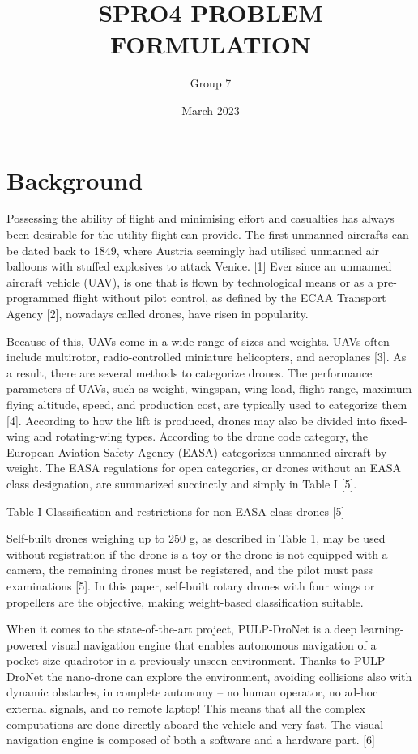 \documentclass{article}
\title{SPRO4 PROBLEM FORMULATION}
\author{Group 7}
\date{March 2023}
\begin{document}
\maketitle
 
\section{Background}

Possessing the ability of flight and minimising effort and casualties has always been desirable for the utility flight can provide. The first unmanned aircrafts can be dated back to 1849, where Austria seemingly had utilised unmanned air balloons with stuffed explosives to attack Venice. [1] Ever since an unmanned aircraft vehicle (UAV), is one that is flown by technological means or as a pre-programmed flight without pilot control, as defined by the ECAA Transport Agency [2], nowadays called drones, have risen in popularity.   


Because of this, UAVs come in a wide range of sizes and weights. UAVs often include multirotor, radio-controlled miniature helicopters, and aeroplanes [3]. As a result, there are several methods to categorize drones. The performance parameters of UAVs, such as weight, wingspan, wing load, flight range, maximum flying altitude, speed, and production cost, are typically used to categorize them [4]. According to how the lift is produced, drones may also be divided into fixed-wing and rotating-wing types. According to the drone code category, the European Aviation Safety Agency (EASA) categorizes unmanned aircraft by weight. The EASA regulations for open categories, or drones without an EASA class designation, are summarized succinctly and simply in Table I [5]. 
 
\graphicspath{}
 Table I Classification and restrictions for non-EASA class drones [5] 

Self-built drones weighing up to 250 g, as described in Table 1, may be used without registration if the drone is a toy or the drone is not equipped with a camera, the remaining drones must be registered, and the pilot must pass examinations [5]. In this paper, self-built rotary drones with four wings or propellers are the objective, making weight-based classification suitable. 

When it comes to the state-of-the-art project, PULP-DroNet is a deep learning-powered visual navigation engine that enables autonomous navigation of a pocket-size quadrotor in a previously unseen environment. Thanks to PULP-DroNet the nano-drone can explore the environment, avoiding collisions also with dynamic obstacles, in complete autonomy -- no human operator, no ad-hoc external signals, and no remote laptop! This means that all the complex computations are done directly aboard the vehicle and very fast. The visual navigation engine is composed of both a software and a hardware part. [6] 
\end{document}
